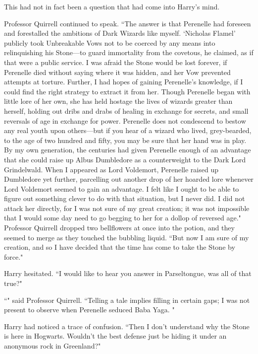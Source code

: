 This had not in fact been a question that had come into Harry's mind.

Professor Quirrell continued to speak. ``The answer is that Perenelle had foreseen and forestalled the ambitions of Dark Wizards like myself. `Nicholas Flamel' publicly took Unbreakable Vows not to be coerced by any means into relinquishing his Stone—to guard immortality from the covetous, he claimed, as if that were a public service. I was afraid the Stone would be lost forever, if Perenelle died without saying where it was hidden, and her Vow prevented attempts at torture. Further, I had hopes of gaining Perenelle's knowledge, if I could find the right strategy to extract it from her. Though Perenelle began with little lore of her own, she has held hostage the lives of wizards greater than herself, holding out dribs and drabs of healing in exchange for secrets, and small reversals of age in exchange for power. Perenelle does not condescend to bestow any real youth upon others—but if you hear of a wizard who lived, grey-bearded, to the age of two hundred and fifty, you may be sure that her hand was in play. By my own generation, the centuries had given Perenelle enough of an advantage that she could raise up Albus Dumbledore as a counterweight to the Dark Lord Grindelwald. When I appeared as Lord Voldemort, Perenelle raised up Dumbledore yet further, parcelling out another drop of her hoarded lore whenever Lord Voldemort seemed to gain an advantage. I felt like I ought to be able to figure out something clever to do with that situation, but I never did. I did not attack her directly, for I was not sure of my great creation; it was not impossible that I would some day need to go begging to her for a dollop of reversed age." Professor Quirrell dropped two bellflowers at once into the potion, and they seemed to merge as they touched the bubbling liquid. ``But now I am sure of my creation, and so I have decided that the time has come to take the Stone by force."

Harry hesitated. ``I would like to hear you answer in Parseltongue, was all of that true?"

``" said Professor Quirrell. ``Telling a tale implies filling in certain gaps; I was not present to observe when Perenelle seduced Baba Yaga. "

Harry had noticed a trace of confusion. ``Then I don't understand why the Stone is here in Hogwarts. Wouldn't the best defense just be hiding it under an anonymous rock in Greenland?"

